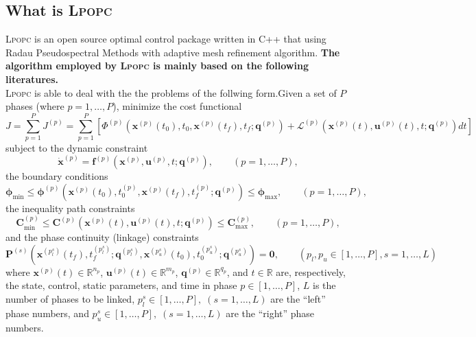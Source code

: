 \documentclass[10pt]{article}
\newcommand{\LPOPC}{\textsc{Lpopc}\xspace}
\begin{document}
    \subsection{What is \LPOPC}
    \LPOPC is an open source optimal control package written in C++ that using  Radau Pseudospectral Methods with adaptive mesh refinement algorithm.
    \textbf{The algorithm employed by \LPOPC is mainly based on the following  literatures\cite{Betts2009}\cite{Patterson2014}\cite{Rao2010}.}\\
    \LPOPC is able to deal with the the problems of the follwing form\cite{Rao2010}.Given a set of $P$ phases (where
    $p=1,\ldots,P$), minimize the cost functional
    \begin{equation}
     J = \sum_{p=1}^{P} J^{(p)} = \sum_{p=1}^{P}
    \left[\Phi^{(p)}(\mathbf{x}^{(p)}(t_0),t_0,\mathbf{x}^{(p)}(t_f),t_f;\mathbf{q}^{(p)})
    + \mathcal{L}^{(p)}(\mathbf{x}^{(p)}(t),\mathbf{u}^{(p)}(t),t;\mathbf{q}^{(p)})dt \right]
    \end{equation}
    subject to the dynamic constraint
    \begin{equation}
    \mathbf{\dot{x}}^{(p)} = \mathbf{f}^{(p)}(\mathbf{x}^{(p)},\mathbf{u}^{(p)},t;\mathbf{q}^{(p)}), \qquad (p=1,\ldots,P),
    \end{equation}
    the boundary conditions
    \begin{equation}
    \mathbf{\phi}_{\min} \leq
    \mathbf{\phi}^{(p)}(\mathbf{x}^{(p)}(t_0),t_0^{(p)},\mathbf{x}^{(p)}(t_f),t_f^{(p)};\mathbf{q}^{(p)})
    \leq \mathbf{\phi}_{\max}, \qquad (p=1,\ldots,P),
    \end{equation}
    the inequality path constraints
    \begin{equation}
    \mathbf{C}_{\min}^{(p)} \leq \mathbf{C}^{(p)}(\mathbf{x}^{(p)}(t),\mathbf{u}^{(p)}(t),t;\mathbf{q}^{(p)})\leq  \mathbf{C}_{\max}^{(p)}, \qquad
    (p=1,\ldots,P),
    \end{equation}
    and the phase continuity (linkage) constraints
    \begin{equation}
    \mathbf{P}^{(s)}(\mathbf{x}^{(p_l^s)}(t_f),t_f^{(p_l^s)};\mathbf{q}^{(p_l^s)},\mathbf{x}^{(p_u^s)}(t_0),t_0^{(p_u^s)};\mathbf{q}^{(p_u^s)})
     =   \mathbf{0}, \qquad (p_l,p_u\in[1,\ldots,P],s=1,\ldots,L)
    \end{equation}
    where $\mathbf{x}^{(p)}(t)\in\mathbb{R}^{n_p}$, $\mathbf{u}^{(p)}(t)\in\mathbb{R}^{m_p}$,
    $\mathbf{q}^{(p)}\in\mathbb{R}^{q_p}$, and $t\in\mathbb{R}$ are, respectively, the state,
    control, static parameters, and time in phase $p\in[1,\ldots,P]$, $L$
    is the number of phases to be linked,
    $p_l^s\in[1,\ldots,P],\;(s=1,\ldots,L)$ are the ``left'' phase numbers,
    and $p_u^s\in[1,\ldots,P],\;(s=1,\ldots,L)$ are the ``right'' phase
    numbers.
\end{document}
